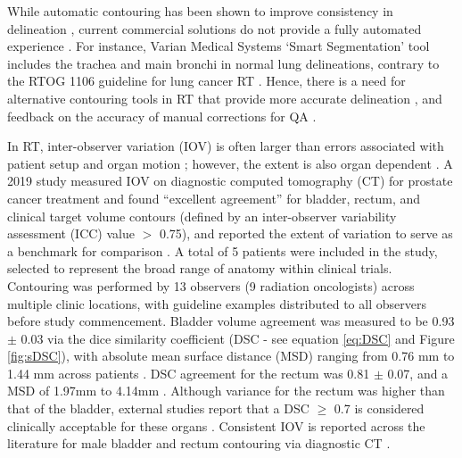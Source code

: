 While automatic contouring has been shown to improve consistency in delineation \cite{Vinod_2016}, current commercial solutions do not provide a fully automated experience \cite{Nemoto_2020}. For instance, Varian Medical Systems `Smart Segmentation' tool includes the trachea and main bronchi in normal lung delineations, contrary to the RTOG 1106 guideline for lung cancer RT \cite{Nemoto_2020}. Hence, there is a need for alternative contouring tools in RT that provide more accurate delineation \cite{Nemoto_2020}, and feedback on the accuracy of manual corrections for QA \cite{Nikolov_2018}.

In RT, inter-observer variation (IOV) is often larger than errors associated with patient setup and organ motion \cite{Vinod_2016, Murakami2013}; however, the extent is also organ dependent \cite{Roach_2019}. A 2019 study measured IOV on diagnostic computed tomography (CT) for prostate cancer treatment and found ``excellent agreement'' for bladder, rectum, and clinical target volume contours (defined by an inter-observer variability assessment (ICC) value $>$ 0.75), and reported the extent of variation to serve as a benchmark for comparison \cite{Roach_2019}.  A total of 5 patients were included in the study, selected to represent the broad range of anatomy within clinical trials. Contouring was performed by 13  observers (9 radiation oncologists) across multiple clinic locations, with guideline examples distributed to all observers before study commencement. Bladder volume agreement was measured to be 0.93 $\pm$ 0.03 via the dice similarity coefficient (DSC \cite{Dice1945} - see equation \ref{eq:DSC} and Figure \ref{fig:sDSC}), with absolute mean surface distance (MSD) ranging from 0.76 mm to 1.44 mm across patients \cite{Roach_2019}. DSC agreement for the rectum was  0.81 $\pm$ 0.07, and a MSD of 1.97mm to 4.14mm \cite{Roach_2019}. Although variance for the rectum was higher than that of the bladder, external studies report that a DSC $\geq$ 0.7 is considered clinically acceptable for these organs \cite{Roach_2019, Sharp2014}. Consistent IOV is reported across the literature for male bladder and rectum contouring via diagnostic CT \cite{Riegal2016}.


